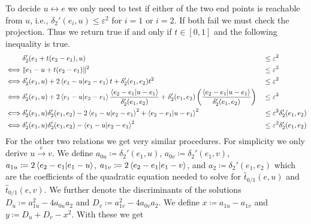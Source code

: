 To decide \(u \leftrightarrow e\) we only need to test if either of the two end points is reachable from \(u\), i.e., \(\delta_2'(e_i, u) \leq \varepsilon^2\) for \(i = 1\) or \(i = 2\). If both fail we must check the projection. Thus we return true if and only if \(t \in [0, 1]\) and the following inequality is true. 
\begin{alignat*}{3}
&\delta_2'(e_1 + t(e_2 - e_1), u) &&\leq \varepsilon^2 \\
  \iff& \|e_1 - u + t(e_2 - e_1)\|^2 &&\leq \varepsilon^2 \\
  \iff& \delta_2'(e_1, u) + 2\braket{e_1 - u | e_2 - e_1}t + \delta_2'(e_1, e_2)t^2 &&\leq \varepsilon^2 \\
  \iff& \delta_2'(e_1, u) + 2\braket{e_1 - u | e_2 - e_1}\frac{\braket{e_2 - e_1 | u - e_1}}{\delta_2'(e_1, e_2)} + \delta_2'(e_1, e_2)\left(\frac{\braket{e_2 - e_1 | u - e_1}}{\delta_2'(e_1, e_2)}\right) &&\leq \varepsilon^2 \\
  \iff& \delta_2'(e_1, u)\delta_2'(e_1, e_2) - 2\braket{e_1 - u | e_2 - e_1}^2 + \braket{e_2 - e_1 | u - e_1}^2 &&\leq \varepsilon^2 \delta_2'(e_1, e_2)\\
  \iff& \delta_2'(e_1, u)\delta_2'(e_1, e_2) - \braket{e_1 - u | e_2 - e_1}^2 &&\leq \varepsilon^2 \delta_2'(e_1, e_2)
\end{alignat*}
For the other two relations we get very similar procedures. For simplicity we only derive \(u \overset e\rightarrow v\). We define \(a_{0u} \coloneq \delta_2'(e_1, u)\), \(a_{0v} \coloneq \delta_2'(e_1, v)\), \(a_{1u} \coloneq 2\braket{e_2 - e_1 | e_1 - u}\), \(a_{1v} \coloneq 2\braket{e_2 - e_1 | e_1 - v}\), and \(a_{2} \coloneq \delta_2'(e_1, e_2)\) which are the coefficients of the quadratic equation needed to solve for \(\hat t_{0/1}(e, u)\) and \(\hat t_{0/1}(e, v)\). We further denote the discriminants of the solutions \(D_u \coloneq a_{1u}^2 - 4a_{0u}a_2\) and \(D_v \coloneq a_{1v}^2 - 4a_{0v}a_2\). We define \(x  \coloneq a_{1u} - a_{1v}\) and \(y \coloneq D_u + D_v - x^2\). With these we get 
